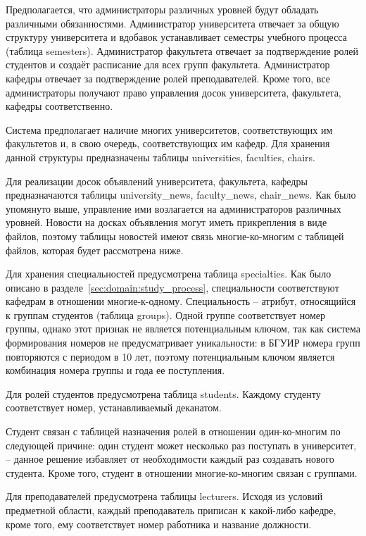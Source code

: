 Предполагается, что администраторы различных уровней будут обладать различными обязанностями. Администратор университета отвечает за общую структуру университета и вдобавок устанавливает семестры учебного процесса (таблица semesters). Администратор факультета отвечает за подтверждение ролей студентов и создаёт расписание для всех групп факультета. Администратор кафедры отвечает за подтверждение ролей преподавателей. Кроме того, все администраторы получают право управления досок университета, факультета, кафедры соответственно.

Система предполагает наличие многих университетов, соответствующих им факультетов и, в свою очередь, соответствующих им кафедр. Для хранения данной структуры предназначены таблицы universities, faculties, chairs. 

Для реализации досок объявлений университета, факультета, кафедры предназначаются таблицы university\_news, faculty\_news, chair\_news. Как было упомянуто выше, управление ими возлагается на администраторов различных уровней. Новости на досках объявления могут иметь прикрепления в виде файлов, поэтому таблицы новостей имеют связь многие-ко-многим с таблицей файлов, которая будет рассмотрена ниже.

Для хранения специальностей предусмотрена таблица specialties. Как было описано в разделе~\ref{sec:domain:study_process}, специальности соответствуют кафедрам в отношении многие-к-одному. Специальность -- атрибут, относящийся к группам студентов (таблица groups). Одной группе соответствует номер группы, однако этот признак не является потенциальным ключом, так как система формирования номеров не предусматривает уникальности: в БГУИР номера групп повторяются с периодом в 10 лет, поэтому потенциальным ключом является комбинация номера группы и года ее поступления.

Для ролей студентов предусмотрена таблица students. Каждому студенту соответствует номер, устанавливаемый деканатом. 

Студент связан с таблицей назначения ролей в отношении один-ко-многим по следующей причине: один студент может несколько раз поступать в университет, -- данное решение избавляет от необходимости каждый раз создавать нового студента. Кроме того, студент в отношении многие-ко-многим связан с группами.

Для преподавателей предусмотрена таблицы lecturers. Исходя из условий предметной области, каждый преподаватель приписан к какой-либо кафедре, кроме того, ему соответствует номер работника и название должности.

